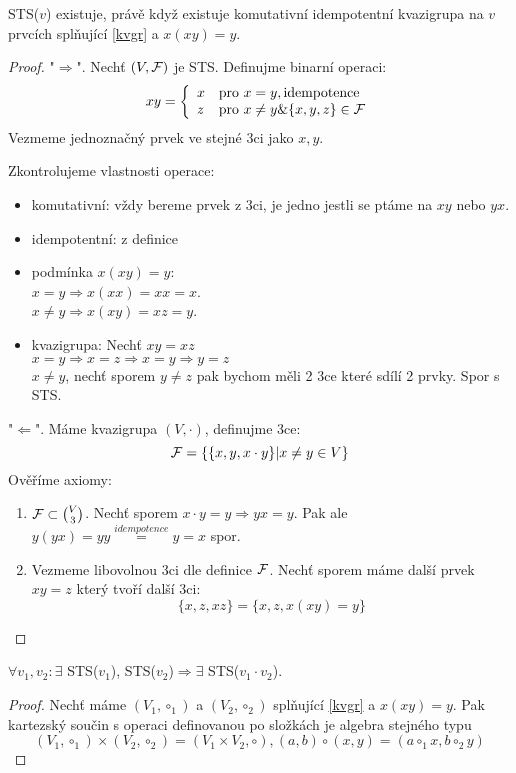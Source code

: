 \begin{theorem}
    STS($v$) existuje, právě když existuje komutativní idempotentní kvazigrupa na $v$ prvcích splňující \cref{kvgr} a $x(xy)=y$.
\end{theorem}
\begin{proof}
	"$\Rightarrow$". Nechť $(V, \operatorname{\mathcal{F}})$ je STS.
	Definujme binarní operaci:
	\[ xy = \left\{ \begin{array}{ll} x & \mbox{pro }  x = y, \text{idempotence} \\ z & \mbox{pro } x \ne y \& \{ x, y, z\} \in \operatorname{\mathcal{F}} \end{array} \right. \]
	Vezmeme jednoznačný prvek ve stejné 3ci jako $x, y$.

	Zkontrolujeme vlastnosti operace:
    	\begin{itemize}
    	    \item komutativní: vždy bereme prvek z 3ci, je jedno jestli se ptáme na $xy$ nebo $yx$.
    	    \item idempotentní: z definice
	    \item podmínka $x(xy)=y$:\\
		    $x = y \Rightarrow x(xx) = xx = x$.\\
		    $x \ne y \Rightarrow x(xy) = xz = y$.
	    \item kvazigrupa: Nechť $xy = xz$ \\
		    $ x = y \Rightarrow x = z \Rightarrow x = y \Rightarrow y = z$\\
		    $x \ne y$, nechť sporem $y \ne z$ pak bychom měli 2 3ce které sdílí 2 prvky.
		    Spor s STS.
    	\end{itemize}

	"$\Leftarrow$". Máme kvazigrupa $(V, \cdot)$, definujme 3ce:
	\[ \operatorname{\mathcal{F}} = \{ \{ x, y , x\cdot y \} | x \ne y \in V \} \]
	Ověříme axiomy:
	\begin{enumerate}
		\item $\operatorname{\mathcal{F}} \subset \binom{V}{3}$. Nechť sporem $x\cdot y = y \Rightarrow yx = y$.
			Pak ale $y(yx) = yy \stackrel{idempotence}{=} y = x$ spor.
		\item Vezmeme libovolnou 3ci dle definice $\operatorname{\mathcal{F}}$.
			Nechť sporem máme další prvek $xy = z$ který tvoří další 3ci:
			\[ \{ x, z, xz \} = \{ x, z, x(xy) = y \} \]
	\end{enumerate}
\end{proof}
\begin{theorem}
    $\forall v_1,v_2: \exists$ STS($v_1$), STS($v_2$)$\Rightarrow\exists$ STS($v_1\cdot v_2$).
\end{theorem}
\begin{proof}
	Nechť máme $(V_1, \circ_1)$ a $(V_2, \circ_2)$ splňující \cref{kvgr} a $x(xy)=y$.
	Pak kartezský součin s operaci definovanou po složkách je algebra stejného typu
	\[ (V_1, \circ_1) \times (V_2, \circ_2) = (V_1 \times V_2, \circ), (a, b) \circ (x, y) = (a \circ_1 x, b \circ_2 y) \]
\end{proof}

